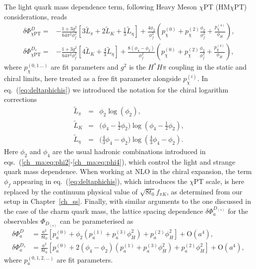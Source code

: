 The light quark mass dependence term, following Heavy Meson $\chi$PT (HM$\chi$PT) considerations,
reads~\cite{Goity:1992tp, Bazavov:2017lyh}
\begin{equation}
	\begin{split}
		\delta \Phi_{\chi {\mathrm{PT}}}^{D} =& - \frac{1+3g^2}{64\pi^2 \phi_f^2} \left[ 3 \tilde{L}_{\pi} + 2 \tilde{L}_{K} + \frac{1}{3} \tilde{L}_{\eta} \right] +
		\frac{4  \phi_2 }{\phi_f^2} \left( p_\chi^{(0)} +  p_\chi^{(2)} \frac{\phi_2}{\phi_f^2} + \frac{p_\chi^{(4)}}{\phi_H} \right),
		\\
		\delta \Phi_{\chi {\mathrm{PT}}}^{D_s} =& - \frac{1+3g^2}{64\pi^2 \phi_f^2} \left[ 4 \tilde{L}_{K} + \frac{4}{3}  \tilde{L}_{\eta} \right] +
		\frac{8 \left( \phi_4 - \phi_2 \right)} {\phi_f^2} \left( p_\chi^{(0)} +  p_\chi^{(2)} \frac{\phi_2}{\phi_f^2} + \frac{p_\chi^{(4)}}{\phi_H} \right),
		\label{eq:deltaphichis} 
	\end{split}
\end{equation}
where $p_\chi^{(0,1\,\dots)}$ are fit parameters and $g^2$ is the
$H^\ast H \pi$ coupling in the static and chiral limits, here treated as a free fit parameter alongside
$p_\chi^{(i)}$.  In eq.~(\ref{eq:deltaphichis}) we introduced  the notation for the chiral logarithm corrections 
\begin{eqnarray}
	\tilde{L}_\pi &=& \phi_2 \log(\phi_2), 
	\\
	\tilde{L}_K &=& \bigg(\phi_4 - \frac{1}{2}\phi_2\bigg)\log\left(\phi_4 - \frac{1}{2}\phi_2\right), 
	\\
	\tilde{L}_\eta &= &\bigg(\frac{4}{3}\phi_4 - \phi_2\bigg)\log\left(\frac{4}{3}\phi_4 - \phi_2\right).
\end{eqnarray}
Here $\phi_2$ and $\phi_4$ are the usual hadronic combinations introduced  in eqs.~(\ref{ch_ma:eq:phi2}-\ref{ch_ma:eq:phi4}),
which control the light and strange quark mass dependence. When working at NLO in the chiral expansion, 
the term
$\phi_f$ appearing in eq.~(\ref{eq:deltaphichis}), which introduces the $\chi$PT scale,
is here replaced by the continuum
physical value  of $\sqrt{8 t_0} f_{\pi K}$, as determined from our setup in Chapter~\ref{ch_ss}.
Finally, with similar arguments to the one discussed in the case of the charm quark mass,
the lattice spacing dependence $\delta\Phi_a^{D_{(s)}}$ for the observables $\Phi_{D_{(s)}}$ can be 
parameterised as 
\begin{equation}
	\begin{split}
		\delta \Phi_{a}^{D} &= \frac{a^2}{8t_0} \left[ p_a^{(0)} +  \phi_2 \left( p_a^{(1)} + p_a^{(3)} \phi_H^2 \right) +  p_a^{(2)} \phi_H^2   \right] + {\mathrm{O}}(a^4)
		,
		\\
		\delta \Phi_{a}^{D_s} &= \frac{a^2}{8t_0} \left[ p_a^{(0)} + 2 \left( \phi_4 - \phi_2 \right) \left( p_a^{(1)} + p_a^{(3)} \phi_H^2 \right) +  p_a^{(2)} \phi_H^2   \right]  + {\mathrm{O}}(a^4),
		\, \label{eq:phias}
	\end{split}
\end{equation}
where $p_a^{(0,1,2,\dots)}$ are fit parameters. 


